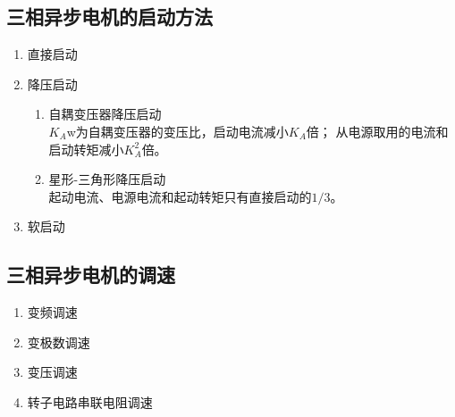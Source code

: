 \subsection{三相异步电机的启动方法}

\begin{enumerate}
    \item 直接启动
    \item 降压启动
    \begin{enumerate}
        \item 自耦变压器降压启动\\
        $K_A$w为自耦变压器的变压比，启动电流减小$K_A$倍；
        从电源取用的电流和启动转矩减小$K_A^2$倍。
        \item 星形-三角形降压启动\\
        起动电流、电源电流和起动转矩只有直接启动的$1/3$。
    \end{enumerate}
    \item 软启动
\end{enumerate}

\subsection{三相异步电机的调速}

\begin{enumerate}
    \item 变频调速
    \item 变极数调速
    \item 变压调速
    \item 转子电路串联电阻调速
\end{enumerate}